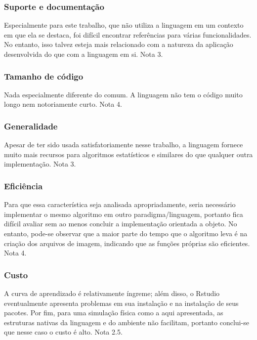 \documentclass[rel_mlp]{iiufrgs}
\begin{document}
\subsubsection{Suporte e documentação}
Especialmente para este trabalho, que não utiliza a linguagem em um contexto em que ela se destaca, foi difícil encontrar referências para várias funcionalidades. No entanto, isso talvez esteja mais relacionado com a natureza da aplicação desenvolvida do que com a linguagem em si. Nota 3.

\subsubsection{Tamanho de código}
Nada especialmente diferente do comum. A linguagem não tem o código muito longo nem notoriamente curto. Nota 4.

\subsubsection{Generalidade}
Apesar de ter sido usada satisfatoriamente nesse trabalho, a linguagem fornece muito mais recursos para algoritmos estatísticos e similares do que qualquer outra implementação. Nota 3.

\subsubsection{Eficiência}
Para que essa característica seja analisada apropriadamente, seria necessário implementar o mesmo algoritmo em outro paradigma/linguagem, portanto fica difícil avaliar sem ao menos concluir a implementação orientada a objeto. No entanto, pode-se observar que a maior parte do tempo que o algoritmo leva é na criação dos arquivos de imagem, indicando que as funções próprias são eficientes. Nota 4.

\subsubsection{Custo}
A curva de aprendizado é relativamente íngreme; além disso, o Rstudio eventualmente apresenta problemas em sua instalação e na instalação de seus pacotes. Por fim, para uma simulação física como a aqui apresentada, as estruturas nativas da linguagem e do ambiente não facilitam, portanto conclui-se que nesse caso o custo é alto. Nota 2.5.



%
\end{document}
